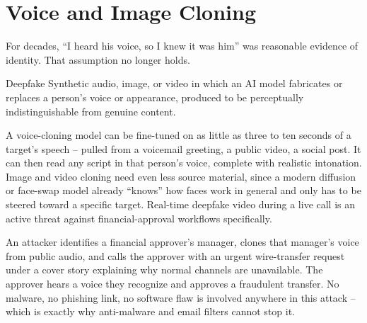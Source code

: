 \section{Voice and Image Cloning}

For decades, ``I heard his voice, so I knew it was him'' was reasonable evidence of identity.
That assumption no longer holds.

\begin{definition}{Deepfake}
Synthetic audio, image, or video in which an AI model fabricates or replaces a person's voice or
appearance, produced to be perceptually indistinguishable from genuine content.
\end{definition}

A voice-cloning model can be fine-tuned on as little as three to ten seconds of a target's
speech -- pulled from a voicemail greeting, a public video, a social post. It can then read any
script in that person's voice, complete with realistic intonation. Image and video cloning need
even less source material, since a modern diffusion or face-swap model already ``knows'' how
faces work in general and only has to be steered toward a specific target. Real-time deepfake
video during a live call is an active threat against financial-approval workflows specifically.

\begin{example}
An attacker identifies a financial approver's manager, clones that manager's voice from public
audio, and calls the approver with an urgent wire-transfer request under a cover story explaining
why normal channels are unavailable. The approver hears a voice they recognize and approves a
fraudulent transfer. No malware, no phishing link, no software flaw is involved anywhere in this
attack -- which is exactly why anti-malware and email filters cannot stop it.
\end{example}

